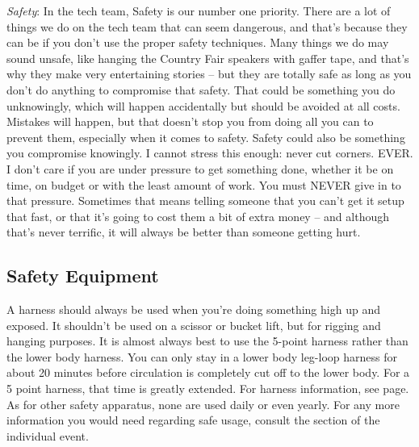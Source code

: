 \documentclass[letterpaper,10pt,oneside,headsepline]{scrreprt}
\begin{document}
\textit{Safety}: In the tech team, Safety is our number one priority. There are a lot of things we do on the tech team that can seem dangerous, and that's because they can be if you don't use the proper safety techniques. Many things we do may sound unsafe, like hanging the Country Fair speakers with gaffer tape, and that's why they make very entertaining stories -- but they are totally safe as long as you don't do anything to compromise that safety. That could be something you do unknowingly, which will happen accidentally but should be avoided at all costs. Mistakes will happen, but that doesn't stop you from doing all you can to prevent them, especially when it comes to safety. Safety could also be something you compromise knowingly. I cannot stress this enough: never cut corners. EVER. I don't care if you are under pressure to get something done, whether it be on time, on budget or with the least amount of work. You must NEVER give in to that pressure. Sometimes that means telling someone that you can't get it setup that fast, or that it's going to cost them a bit of extra money -- and although that's never terrific, it will always be better than someone getting hurt.

\subsection{Safety Equipment}
A harness should always be used when you're doing something high up and exposed. It shouldn't be used on a scissor or bucket lift, but for rigging and hanging purposes. It is almost always best to use the 5-point harness rather than the lower body harness. You can only stay in a lower body leg-loop harness for about 20 minutes before circulation is completely cut off to the lower body. For a 5 point harness, that time is greatly extended. For harness information, see page. As for other safety apparatus, none are used daily or even yearly. For any more information you would need regarding safe usage, consult the section of the individual event.

\end{document}
